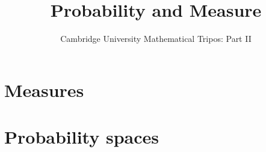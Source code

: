 \documentclass{article}
\title{Probability and Measure}
\author{Cambridge University Mathematical Tripos: Part II}
\begin{document}
\maketitle

\tableofcontentsnewpage{}

\section{Measures}

\section{Probability spaces}

\end{document}
